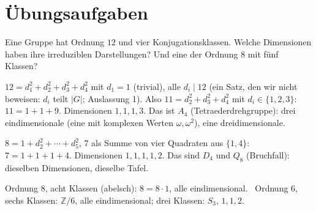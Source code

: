\section{Übungsaufgaben}

\begin{aufgabe}
Eine Gruppe hat Ordnung $12$ und vier Konjugationsklassen. Welche Dimensionen haben ihre irreduziblen Darstellungen? Und eine der Ordnung $8$ mit fünf Klassen?

\loesung
{}
$12 = d_1^{2} + d_2^{2} + d_3^{2} + d_4^{2}$ mit $d_1 = 1$ (trivial), alle $d_i\mid12$ (ein Satz, den wir nicht beweisen: $d_i$ teilt $|G|$; Auslassung 1). Also $11 = d_2^{2} + d_3^{2} + d_4^{2}$ mit $d_i\in\{1, 2, 3\}$: $11 = 1 + 1 + 9$. Dimensionen $1, 1, 1, 3$. Das ist $A_4$ (Tetraederdrehgruppe): drei eindimensionale (eine mit komplexen Werten $\omega, \omega^{2}$), eine dreidimensionale.

$8 = 1 + d_2^{2} + \cdots + d_5^{2}$, $7$ als Summe von vier Quadraten aus $\{1, 4\}$: $7 = 1 + 1 + 1 + 4$. Dimensionen $1, 1, 1, 1, 2$. Das sind $D_4$ und $Q_8$ (Bruchfall): dieselben Dimensionen, dieselbe Tafel.

Ordnung $8$, acht Klassen (abelsch): $8 = 8\cdot1$, alle eindimensional. \checkmark\ Ordnung $6$, sechs Klassen: $\mathbb Z/6$, alle eindimensional; drei Klassen: $S_3$, $1, 1, 2$. \checkmark

\begin{center}
\begin{minipage}{0.88\textwidth}
\end{minipage}
\end{center}
\end{aufgabe}

